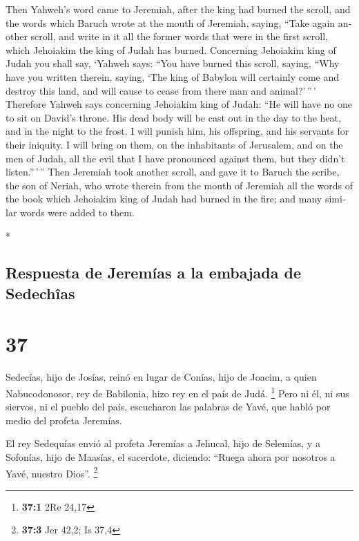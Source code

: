 \begin{paracol}{2}
\begin{otherlanguage}{english}
 Then Yahweh's word came to Jeremiah, after the king had
burned the scroll, and the words which Baruch wrote at the mouth of
Jeremiah, saying,  ``Take again another scroll, and write
in it all the former words that were in the first scroll, which
Jehoiakim the king of Judah has burned.  Concerning
Jehoiakim king of Judah you shall say, `Yahweh says: ``You have burned
this scroll, saying, ``Why have you written therein, saying, `The king
of Babylon will certainly come and destroy this land, and will cause to
cease from there man and animal?'\,''\,'  Therefore
Yahweh says concerning Jehoiakim king of Judah: ``He will have no one to
sit on David's throne. His dead body will be cast out in the day to the
heat, and in the night to the frost.  I will punish him,
his offspring, and his servants for their iniquity. I will bring on
them, on the inhabitants of Jerusalem, and on the men of Judah, all the
evil that I have pronounced against them, but they didn't
listen.''\,'\,''  Then Jeremiah took another scroll, and
gave it to Baruch the scribe, the son of Neriah, who wrote therein from
the mouth of Jeremiah all the words of the book which Jehoiakim king of
Judah had burned in the fire; and many similar words were added to them.

\end{otherlanguage}

\switchcolumn[0]*

\hypertarget{respuesta-de-jeremuxedas-a-la-embajada-de-sedechuxeeas}{%
\subsection{Respuesta de Jeremías a la embajada de
Sedechîas}\label{respuesta-de-jeremuxedas-a-la-embajada-de-sedechuxeeas}}

\hypertarget{section-72}{%
\section{37}\label{section-72}}

 Sedecías, hijo de Josías, reinó en lugar de Conías, hijo
de Joacim, a quien Nabucodonosor, rey de Babilonia, hizo rey en el país
de Judá. \footnote{\textbf{37:1} 2Re 24,17}  Pero ni él,
ni sus siervos, ni el pueblo del país, escucharon las palabras de Yavé,
que habló por medio del profeta Jeremías.

 El rey Sedequías envió al profeta Jeremías a Jehucal,
hijo de Selemías, y a Sofonías, hijo de Maasías, el sacerdote, diciendo:
``Ruega ahora por nosotros a Yavé, nuestro Dios''. \footnote{\textbf{37:3}
  Jer 42,2; Is 37,4}


\end{paracol}
